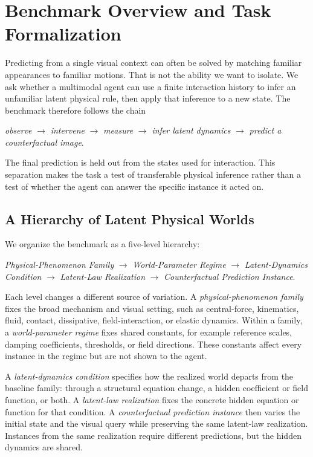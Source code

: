 \section{Benchmark Overview and Task Formalization}
\label{sec:benchmark}

Predicting from a single visual context can often be solved by matching familiar appearances to familiar motions. That is not the ability we want to isolate. We ask whether a multimodal agent can use a finite interaction history to infer an unfamiliar latent physical rule, then apply that inference to a new state. The benchmark therefore follows the chain
\begin{center}
\emph{observe} $\rightarrow$ \emph{intervene} $\rightarrow$ \emph{measure}
$\rightarrow$ \emph{infer latent dynamics} $\rightarrow$
\emph{predict a counterfactual image}.
\end{center}
The final prediction is held out from the states used for interaction. This separation makes the task a test of transferable physical inference rather than a test of whether the agent can answer the specific instance it acted on.

\subsection{A Hierarchy of Latent Physical Worlds}

We organize the benchmark as a five-level hierarchy:
\begin{center}
\textit{Physical-Phenomenon Family}
$\rightarrow$ \textit{World-Parameter Regime}
$\rightarrow$ \textit{Latent-Dynamics Condition}
$\rightarrow$ \textit{Latent-Law Realization}
$\rightarrow$ \textit{Counterfactual Prediction Instance}.
\end{center}
Each level changes a different source of variation. A \emph{physical-phenomenon family} fixes the broad mechanism and visual setting, such as central-force, kinematics, fluid, contact, dissipative, field-interaction, or elastic dynamics. Within a family, a \emph{world-parameter regime} fixes shared constants, for example reference scales, damping coefficients, thresholds, or field directions. These constants affect every instance in the regime but are not shown to the agent.

A \emph{latent-dynamics condition} specifies how the realized world departs from the baseline family: through a structural equation change, a hidden coefficient or field function, or both. A \emph{latent-law realization} fixes the concrete hidden equation or function for that condition. A \emph{counterfactual prediction instance} then varies the initial state and the visual query while preserving the same latent-law realization. Instances from the same realization require different predictions, but the hidden dynamics are shared.


